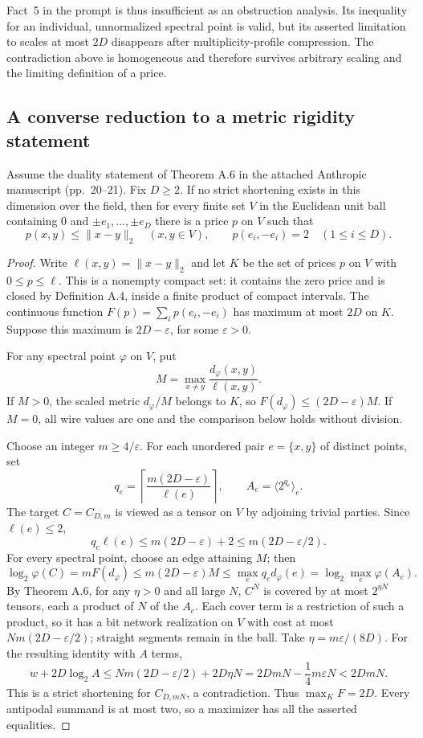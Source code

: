 Fact~5 in the prompt is thus insufficient as an obstruction analysis.
Its inequality for an individual, unnormalized spectral point is valid,
but its asserted limitation to scales at most $2D$ disappears after
multiplicity-profile compression.  The contradiction above is homogeneous
and therefore survives arbitrary scaling and the limiting definition of
a price.

\subsection{A converse reduction to a metric rigidity statement}

\begin{proposition}
\label{prop:saturated-diameters}
Assume the duality statement of Theorem A.6 in the attached Anthropic
manuscript (pp.~20--21).  Fix $D\ge2$.  If no strict shortening exists in
this dimension over the field, then for every finite set $V$ in the Euclidean unit ball
containing $0$ and $\pm e_1,\ldots,\pm e_D$ there is a price $p$ on $V$
such that
\[
 p(x,y)\le\|x-y\|_2\quad(x,y\in V),\qquad
 p(e_i,-e_i)=2\quad(1\le i\le D).
\]
\end{proposition}
\begin{proof}
Write $\ell(x,y)=\|x-y\|_2$ and let $K$ be the set of prices $p$ on $V$
with $0\le p\le\ell$.  This is a nonempty compact set: it contains the
zero price and is closed by Definition A.4, inside a finite product of
compact intervals.  The continuous function
$F(p)=\sum_i p(e_i,-e_i)$ has maximum at most $2D$ on $K$.  Suppose this
maximum is $2D-\varepsilon$, for some $\varepsilon>0$.

For any spectral point $\varphi$ on $V$, put
\[
 M=\max_{x\ne y}\frac{d_\varphi(x,y)}{\ell(x,y)}.
\]
If $M>0$, the scaled metric $d_\varphi/M$ belongs to $K$, so
$F(d_\varphi)\le(2D-\varepsilon)M$.  If $M=0$, all wire values are one
and the comparison below holds without division.

Choose an integer $m\ge4/\varepsilon$.  For each unordered pair
$e=\{x,y\}$ of distinct points, set
\[
 q_e=\left\lceil\frac{m(2D-\varepsilon)}{\ell(e)}\right\rceil,
 \qquad A_e=\langle2^{q_e}\rangle_e.
\]
The target $C=C_{D,m}$ is viewed as a tensor on $V$ by adjoining trivial
parties.  Since $\ell(e)\le2$,
\[
 q_e\ell(e)\le m(2D-\varepsilon)+2
       \le m(2D-\varepsilon/2).
\]
For every spectral point, choose an edge attaining $M$; then
\[
 \log_2\varphi(C)=mF(d_\varphi)
 \le m(2D-\varepsilon)M
 \le\max_e q_e d_\varphi(e)=\log_2\max_e\varphi(A_e).
\]
By Theorem A.6, for any $\eta>0$ and all large $N$, $C^N$ is covered by
at most $2^{\eta N}$ tensors, each a product of $N$ of the $A_e$.
Each cover term is a restriction of such a product, so it has a bit
network realization on $V$ with cost at most
$Nm(2D-\varepsilon/2)$; straight segments remain in the ball.  Take
$\eta=m\varepsilon/(8D)$.  For the resulting identity with $A$ terms,
\[
 w+2D\log_2 A
 \le Nm(2D-\varepsilon/2)+2D\eta N
 =2DmN-\frac14m\varepsilon N<2DmN.
\]
This is a strict shortening for $C_{D,mN}$, a contradiction.
Thus $\max_KF=2D$.  Every antipodal summand is at most two, so a maximizer
has all the asserted equalities.
\end{proof}

